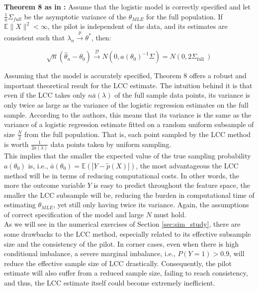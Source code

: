 \textbf{Theorem 8 as in \textcite{hastie2014}:} Assume that the logistic model is correctly specified and let $\frac{1}{n} \Sigma_{full}$ be the asymptotic variance of the $\theta_{MLE}$ for the full population. If $\mathbb{E}\|X\|^2<\infty$, the pilot is independent of the data, and its estimates are consistent such that $\lambda_n \stackrel{p}{\rightarrow} \theta^*$, then:

\begin{equation}
    \sqrt{n}\left(\hat{\theta}_n-\theta_0\right) \stackrel{\mathcal{D}}{\rightarrow} N\left(0, a\left(\theta_0\right)^{-1} \Sigma\right)=N\left(0,2 \Sigma_{\text {full }}\right)
\end{equation}

Assuming that the model is accurately specified, Theorem 8 offers a robust and important theoretical result for the LCC estimate. The intuition behind it is that even if the LCC takes only $n\bar{a}(\lambda)$ of the full sample data points, its variance is only twice as large as the variance of the logistic regression estimates on the full sample. According to the authors, this means that its variance is the same as the variance of a logistic regression estimate fitted on a random uniform subsample of size $\frac{N}{2}$ from the full population. That is, each point sampled by the LCC method is worth $\frac{1}{2\bar{a}(\lambda)}$ data points taken by uniform sampling. \\

This implies that the smaller the expected value of the true sampling probability $a(\theta_0)$ is, i.e., $\bar{a}\left(\theta_0\right)=\mathbb{E}(|Y-\tilde{p}(X)|)$, the most advantageous the LCC method will be in terms of reducing computational costs. In other words, the more the outcome variable $Y$ is easy to predict throughout the feature space, the smaller the LCC subsample will be, reducing the burden in computational time of estimating $\theta_{MLE}$, yet still only having twice its variance. Again, the assumptions of correct specification of the model and large $N$ must hold.\\

As we will see in the numerical exercises of Section \ref{sec:sim_study}, there are some drawbacks to the LCC method, especially related to its effective subsample size and the consistency of the pilot. In corner cases, even when there is high conditional imbalance, a severe marginal imbalance, i.e., $P(Y=1) > 0.9$, will reduce the effective sample size of LCC drastically. Consequently, the pilot estimate will also suffer from a reduced sample size, failing to reach consistency, and thus, the LCC estimate itself could become extremely inefficient. 
